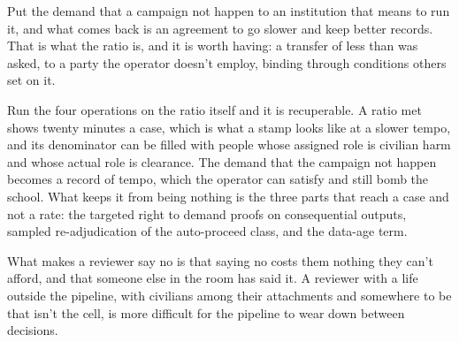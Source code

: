 Put the demand that a campaign not happen to an institution that means to run it, and what comes back is an agreement to go slower and keep better records. That is what the ratio is, and it is worth having: a transfer of less than was asked, to a party the operator doesn't employ, binding through conditions others set on it.

Run the four operations on the ratio itself and it is recuperable. A ratio met shows twenty minutes a case, which is what a stamp looks like at a slower tempo, and its denominator can be filled with people whose assigned role is civilian harm and whose actual role is clearance. The demand that the campaign not happen becomes a record of tempo, which the operator can satisfy and still bomb the school. What keeps it from being nothing is the three parts that reach a case and not a rate: the targeted right to demand proofs on consequential outputs, sampled re-adjudication of the auto-proceed class, and the data-age term.

What makes a reviewer say no is that saying no costs them nothing they can't afford, and that someone else in the room has said it. A reviewer with a life outside the pipeline, with civilians among their attachments and somewhere to be that isn't the cell, is more difficult for the pipeline to wear down between decisions.
